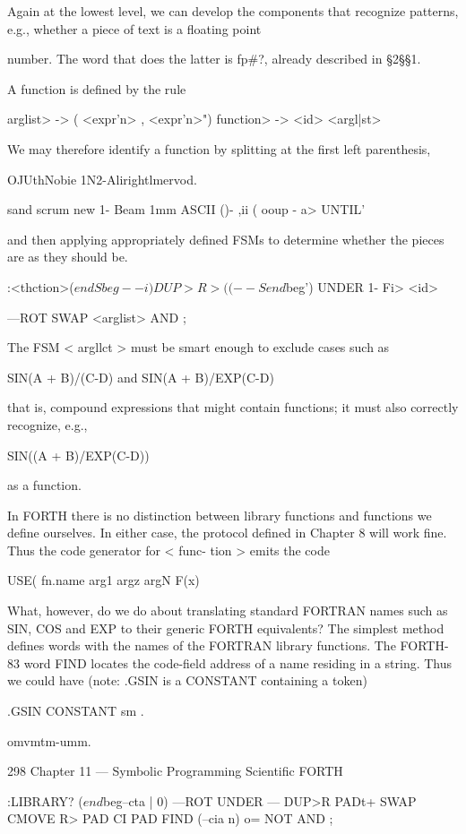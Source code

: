 Again at the lowest level, we can develop the components that
recognize patterns, e.g., whether a piece of text is a ﬂoating point

number. The word that does the latter is fp#?, already described
in §2§§1.

A function is defined by the rule

\<arglist> -> ( <expr'n> {, <expr'n>}")
\<function> -> <id> <argl|st>

We may therefore identify a function by splitting at the ﬁrst left
parenthesis,

OJUthNobie 1N2-Alirightlmervod.

sand scrum new
1- Beam 1mm ASCII ()- ,ii (
ooup - a> UNTIL'

and then applying appropriately deﬁned FSMs to determine
whether the pieces are as they should be.

:<thction>($endSbeg--i)
DUP>R >( (--Send$beg')
UNDER 1- Fi> <id>

—ROT SWAP <arglist> AND ;

The FSM < argllct > must be smart enough to exclude cases such
as

SIN(A + B)/(C-D)
and
SIN(A + B)/EXP(C-D)

that is, compound expressions that might contain functions; it
must also correctly recognize, e.g.,

SIN((A + B)/EXP(C-D))

as a function.

In FORTH there is no distinction between library functions and
functions we deﬁne ourselves. In either case, the protocol deﬁned
in Chapter 8 will work ﬁne. Thus the code generator for < func-
tion > emits the code

USE( fn.name arg1 argz argN F(x)

What, however, do we do about translating standard FORTRAN
names such as SIN, COS and EXP to their generic FORTH
equivalents? The simplest method deﬁnes words with the names
of the FORTRAN library functions. The FORTH-83 word FIND
locates the code-ﬁeld address of a name residing in a string. Thus
we could have (note: .GSIN is a CONSTANT containing a token)

.GSIN CONSTANT sm \etc.

omvmtm-umm.

298 Chapter 11 — Symbolic Programming Scientiﬁc FORTH

:LIBRARY? ($end$beg--cta | 0)
—ROT UNDER — DUP>R
PADt+ SWAP CMOVE R> PAD CI \makes
PAD FIND (--cia n) o= NOT AND ;

